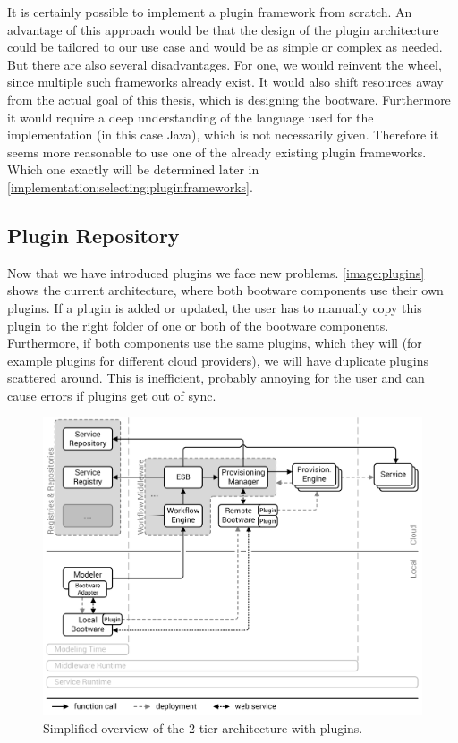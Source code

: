 It is certainly possible to implement a plugin framework from scratch.
An advantage of this approach would be that the design of the plugin architecture could be tailored to our use case and would be as simple or complex as needed.
But there are also several disadvantages.
For one, we would reinvent the wheel, since multiple such frameworks already exist.
It would also shift resources away from the actual goal of this thesis, which is designing the bootware.
Furthermore it would require a deep understanding of the language used for the implementation (in this case Java), which is not necessarily given.
Therefore it seems more reasonable to use one of the already existing plugin frameworks.
Which one exactly will be determined later in \autoref{implementation:selecting:pluginframeworks}.

\subsection{Plugin Repository}
\label{design:pluginrepository}

Now that we have introduced plugins we face new problems.
\autoref{image:plugins} shows the current architecture, where both bootware components use their own plugins.
If a plugin is added or updated, the user has to manually copy this plugin to the right folder of one or both of the bootware components.
Furthermore, if both components use the same plugins, which they will (for example plugins for different cloud providers), we will have duplicate plugins scattered around.
This is inefficient, probably annoying for the user and can cause errors if plugins get out of sync.

\begin{figure}[!htbp]
	\centering
	\includegraphics[resolution=600]{design/assets/plugins}
	\caption{Simplified overview of the 2-tier architecture with plugins.}
	\label{image:plugins}
\end{figure}

